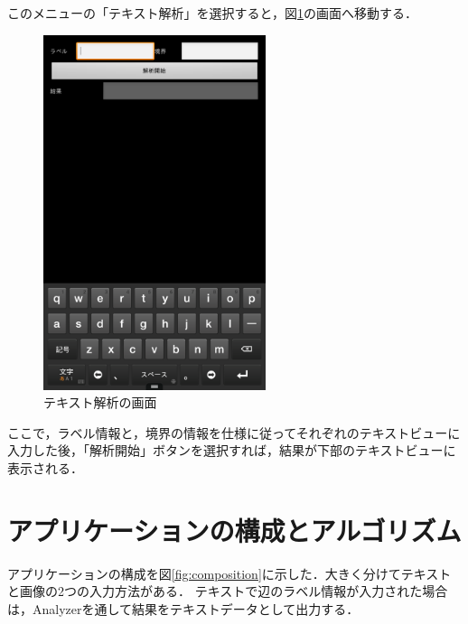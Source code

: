 \documentclass{jarticle}
\begin{document}
このメニューの「テキスト解析」を選択すると，図\ref{fig:text}の画面へ移動する．
\begin{figure}[H]
\begin{center}
\includegraphics[width=65mm]{../play_store/text.png}
\caption{テキスト解析の画面}
\label{fig:text}
\end{center}
\end{figure}

ここで，ラベル情報と，境界の情報を仕様に従ってそれぞれのテキストビューに入力した後，「解析開始」ボタンを選択すれば，結果が下部のテキストビューに表示される．




\section{アプリケーションの構成とアルゴリズム\cite{ref:opencv_api}}
アプリケーションの構成を図\ref{fig:composition}に示した．大きく分けてテキストと画像の2つの入力方法がある．
テキストで辺のラベル情報が入力された場合は，Analyzerを通して結果をテキストデータとして出力する．
\end{document}
